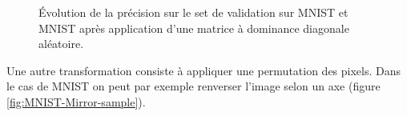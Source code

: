 \begin{figure}[htbp]
\centering
{}
\hfill
{}
\caption{Évolution de la précision sur le set de validation sur MNIST et MNIST
	après application d'une matrice à dominance diagonale aléatoire.}
\label{fig:MNISTA}
\end{figure}

Une autre transformation consiste à appliquer une permutation des pixels.
Dans le cas de MNIST on peut par exemple renverser l'image selon un axe 
(figure \ref{fig:MNIST-Mirror-sample}).

